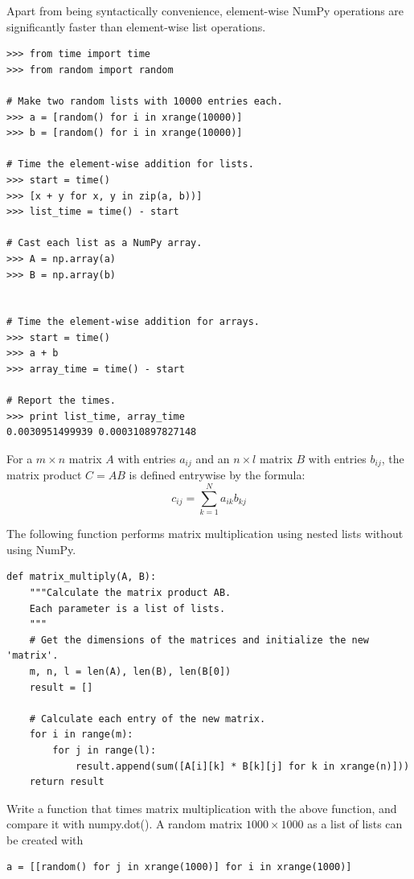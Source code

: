 Apart from being syntactically convenience, element-wise NumPy operations are significantly faster than element-wise list operations.

\begin{lstlisting}
>>> from time import time
>>> from random import random

# Make two random lists with 10000 entries each.
>>> a = [random() for i in xrange(10000)]
>>> b = [random() for i in xrange(10000)]

# Time the element-wise addition for lists.
>>> start = time()
>>> [x + y for x, y in zip(a, b))]
>>> list_time = time() - start

# Cast each list as a NumPy array.
>>> A = np.array(a)
>>> B = np.array(b)


# Time the element-wise addition for arrays.
>>> start = time()
>>> a + b
>>> array_time = time() - start

# Report the times.
>>> print list_time, array_time
0.0030951499939 0.000310897827148
\end{lstlisting}


\begin{problem} %
For a $m\times n$ matrix $A$ with entries $a_{ij}$ and an $n\times l$ matrix $B$ with entries $b_{ij}$, the matrix product $C = AB$ is defined entrywise by the formula:
\[c_{ij} = \sum_{k=1}^N a_{ik}b_{kj}\]

The following function performs matrix multiplication using nested lists without using NumPy.

\begin{lstlisting}
def matrix_multiply(A, B):
    """Calculate the matrix product AB.
    Each parameter is a list of lists.
    """
    # Get the dimensions of the matrices and initialize the new 'matrix'.
    m, n, l = len(A), len(B), len(B[0])
    result = []

    # Calculate each entry of the new matrix.
    for i in range(m):
        for j in range(l):
            result.append(sum([A[i][k] * B[k][j] for k in xrange(n)]))
    return result
\end{lstlisting}

Write a function that times matrix multiplication with the above function, and compare it with numpy.dot().
A random matrix $1000\times 1000$ as a list of lists can be created with
\begin{lstlisting}
a = [[random() for j in xrange(1000)] for i in xrange(1000)]
\end{lstlisting}

\end{problem}


